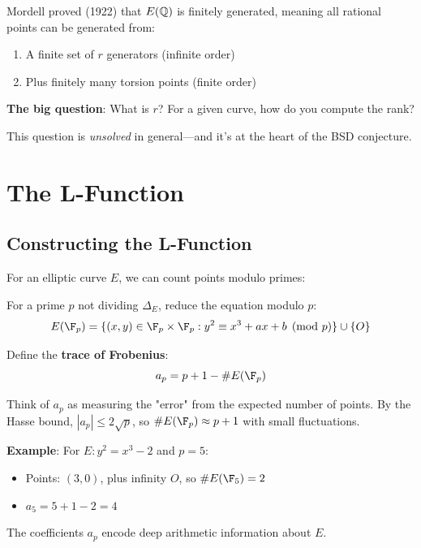 \begin{keyidea}
Mordell proved (1922)\cite{mordell1922rational} that $E(\mathbb{Q})$ is finitely generated, meaning all rational points can be generated from:
\begin{enumerate}
\item A finite set of $r$ generators (infinite order)
\item Plus finitely many torsion points (finite order)
\end{enumerate}

\textbf{The big question}: What is $r$? For a given curve, how do you compute the rank?

This question is \textit{unsolved} in general—and it's at the heart of the BSD conjecture.
\end{keyidea}

\section{The L-Function}

\subsection{Constructing the L-Function}

For an elliptic curve $E$, we can count points modulo primes:

\begin{defn}\label{def:reduction-mod-p}
For a prime $p$ not dividing $\Delta_E$, reduce the equation modulo $p$:
\begin{equation}
E(\F_p) = \{(x, y) \in \F_p \times \F_p : y^2 \equiv x^3 + ax + b \pmod{p}\} \cup \{O\}
\end{equation}

Define the \textbf{trace of Frobenius}:
\begin{equation}
a_p = p + 1 - \#E(\F_p)
\end{equation}
\end{defn}

\begin{intuitive}
Think of $a_p$ as measuring the "error" from the expected number of points. By the Hasse bound, $|a_p| \leq 2\sqrt{p}$, so $\#E(\F_p) \approx p + 1$ with small fluctuations.

\textbf{Example}: For $E: y^2 = x^3 - 2$ and $p = 5$:
\begin{itemize}
\item Points: $(3,0)$, plus infinity $O$, so $\#E(\F_5) = 2$
\item $a_5 = 5 + 1 - 2 = 4$
\end{itemize}

The coefficients $a_p$ encode deep arithmetic information about $E$.
\end{intuitive}

